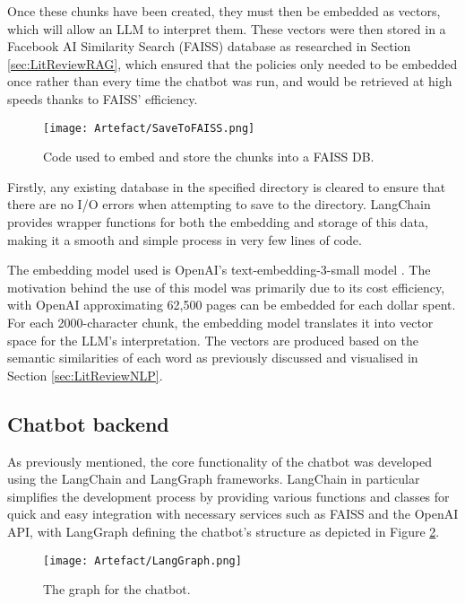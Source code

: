 \para Once these chunks have been created, they must then be embedded as vectors, which will allow an LLM to interpret them. These 
vectors were then stored in a Facebook AI Similarity Search (FAISS) database as researched in Section \ref{sec:LitReviewRAG}, which 
ensured that the policies only needed to be embedded once rather than every time the chatbot was run, and would be retrieved 
at high speeds thanks to FAISS' efficiency.

\begin{figure}[H]
    \centering
    \texttt{[image: Artefact/SaveToFAISS.png]}
    \caption{Code used to embed and store the chunks into a FAISS DB. \label{fig:LangChainStoreFAISS}}
\end{figure}

\noindent Firstly, any existing database in the specified directory is cleared to ensure that there are no I/O errors when attempting 
to save to the directory. LangChain provides wrapper functions for both the embedding and storage of this data, making it a smooth 
and simple process in very few lines of code. 

\para  The embedding model used is OpenAI's text-embedding-3-small model \autocite{openai_vector_nodate}. The motivation behind the use of this model was primarily due to its cost efficiency, with OpenAI approximating 62,500 pages can be embedded for each dollar spent. For each 
2000-character chunk, the embedding model translates it into vector space for the LLM's interpretation. The vectors are produced based on the 
semantic similarities of each word as previously discussed and visualised in Section \ref{sec:LitReviewNLP}. 




\subsection{Chatbot backend}\label{sec:ChatbotBackend}
As previously mentioned, the core functionality of the chatbot was developed using the LangChain and LangGraph frameworks. LangChain in particular
simplifies the development process by providing various functions and classes for quick and easy integration with necessary services such 
as FAISS and the OpenAI API, with LangGraph defining the chatbot's structure as depicted in Figure \ref{fig:ChatbotLangGraph}. 

\begin{figure}[H]
    \centering
    \texttt{[image: Artefact/LangGraph.png]}
    \caption{The graph for the chatbot. \label{fig:ChatbotLangGraph}}
\end{figure}


